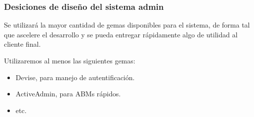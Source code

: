 \subsubsection{Desiciones de diseño del sistema admin}

Se utilizará la mayor cantidad de gemas disponibles para el sistema, de forma tal que ascelere el desarrollo y se pueda entregar rápidamente algo de utilidad al cliente final.

Utilizaremos al menos las siguientes gemas:
\begin{itemize}
	\item Devise, para manejo de autentificación.
	\item ActiveAdmin, para ABMs rápidos.
	\item etc.
\end{itemize}